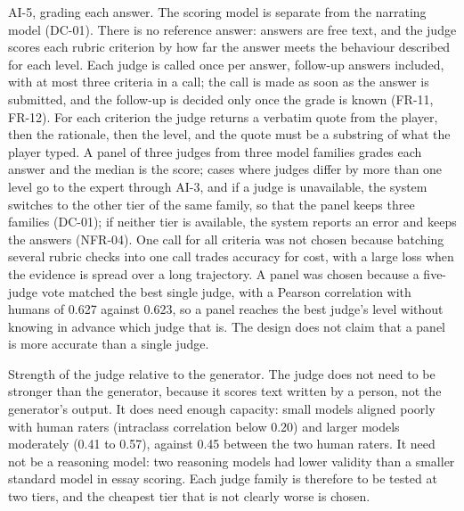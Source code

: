 AI-5, grading each answer. The scoring model is separate from the narrating model (DC-01). There is no reference answer: answers are free text, and the judge scores each rubric criterion by how far the answer meets the behaviour described for each level. Each judge is called once per answer, follow-up answers included, with at most three criteria in a call; the call is made as soon as the answer is submitted, and the follow-up is decided only once the grade is known (FR-11, FR-12). For each criterion the judge returns a verbatim quote from the player, then the rationale, then the level, and the quote must be a substring of what the player typed. A panel of three judges from three model families grades each answer and the median is the score; cases where judges differ by more than one level go to the expert through AI-3, and if a judge is unavailable, the system switches to the other tier of the same family, so that the panel keeps three families (DC-01); if neither tier is available, the system reports an error and keeps the answers (NFR-04). One call for all criteria was not chosen because batching several rubric checks into one call trades accuracy for cost, with a large loss when the evidence is spread over a long trajectory\cite{r123}. A panel was chosen because a five-judge vote matched the best single judge, with a Pearson correlation with humans of 0.627 against 0.623\cite{r124}, so a panel reaches the best judge's level without knowing in advance which judge that is. The design does not claim that a panel is more accurate than a single judge.

Strength of the judge relative to the generator. The judge does not need to be stronger than the generator, because it scores text written by a person, not the generator's output. It does need enough capacity: small models aligned poorly with human raters (intraclass correlation below 0.20) and larger models moderately (0.41 to 0.57), against 0.45 between the two human raters\cite{r125}. It need not be a reasoning model: two reasoning models had lower validity than a smaller standard model in essay scoring\cite{r126}. Each judge family is therefore to be tested at two tiers, and the cheapest tier that is not clearly worse is chosen.

